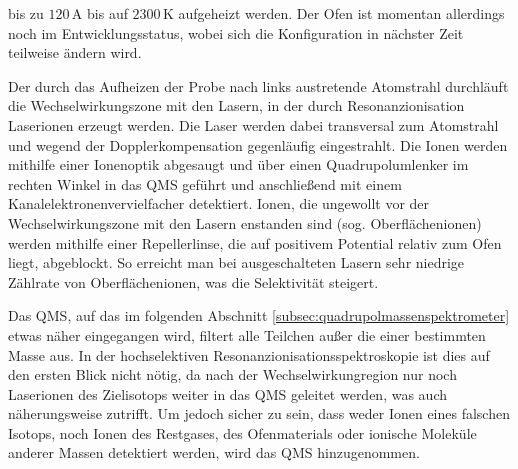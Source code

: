 bis zu $120\,$A bis auf $2300\,$K aufgeheizt werden. Der Ofen
ist momentan allerdings noch im Entwicklungsstatus, wobei sich die Konfiguration
in nächster Zeit teilweise ändern wird.\par
Der durch das Aufheizen der Probe nach links austretende Atomstrahl durchläuft
die Wechselwirkungszone mit den Lasern, in der durch Resonanzionisation
Laserionen erzeugt werden. Die Laser werden dabei transversal zum Atomstrahl
und wegend der Dopplerkompensation gegenläufig eingestrahlt. Die Ionen werden
mithilfe einer Ionenoptik abgesaugt und über einen Quadrupolumlenker im rechten Winkel in das QMS geführt und anschließend mit einem Kanalelektronenvervielfacher detektiert. Ionen, die ungewollt vor der
Wechselwirkungszone mit den Lasern enstanden sind (sog.
Oberflächenionen) werden mithilfe einer Repellerlinse, die auf positivem
Potential relativ zum Ofen liegt, abgeblockt.
So erreicht man bei ausgeschalteten Lasern sehr niedrige Zählrate von
Oberflächenionen, was die Selektivität steigert.\par
Das QMS, auf das im folgenden Abschnitt \ref{subsec:quadrupolmassenspektrometer}
etwas näher eingegangen wird, filtert alle Teilchen außer die einer bestimmten
Masse aus. In der hochselektiven Resonanzionisationsspektroskopie ist dies auf
den ersten Blick nicht nötig, da nach der Wechselwirkungregion nur noch
Laserionen des Zielisotops weiter in das QMS geleitet werden, was auch
näherungsweise zutrifft. Um jedoch sicher zu sein, dass weder Ionen eines
falschen Isotops, noch Ionen des Restgases, des Ofenmaterials oder ionische
Moleküle anderer Massen detektiert werden, wird das QMS hinzugenommen.

